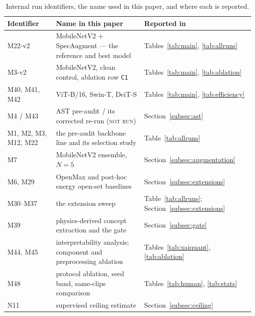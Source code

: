 \documentclass[journal,onecolumn]{IEEEtran}
\newcommand{\notrun}{\textsc{not run}}
\begin{document}
\begin{table}[!htbp]
\centering
\caption{Internal run identifiers, the name used in this paper, and where each is reported.}
\label{tab:runmap}
\footnotesize
\begin{tabular}{lll}
\toprule
Identifier & Name in this paper & Reported in \\
\midrule
M22-v2 & MobileNetV2 + SpecAugment --- the reference and best model & Tables~\ref{tab:main}, \ref{tab:allruns} \\
M3-v2 & MobileNetV2, clean control, ablation row \texttt{C1} & Tables~\ref{tab:main}, \ref{tab:ablation} \\
M40, M41, M42 & ViT-B/16, Swin-T, DeiT-S & Tables~\ref{tab:main}, \ref{tab:efficiency} \\
M4 / M43 & AST pre-audit / its corrected re-run (\notrun) & Section~\ref{subsec:ast} \\
M1, M2, M3, M12, M22 & the pre-audit backbone line and its selection study & Table~\ref{tab:allruns} \\
M7 & MobileNetV2 ensemble, $N = 5$ & Section~\ref{subsec:augmentation} \\
M6, M29 & OpenMax and post-hoc energy open-set baselines & Section~\ref{subsec:extensions} \\
M30--M37 & the extension sweep & Table~\ref{tab:allruns}; Section~\ref{subsec:extensions} \\
M39 & physics-derived concept extraction and the gate & Section~\ref{subsec:gate} \\
M44, M45 & interpretability analysis; component and preprocessing ablation & Tables~\ref{tab:xaiquant}, \ref{tab:ablation} \\
M48 & protocol ablation, seed band, same-clips comparison & Tables~\ref{tab:human}, \ref{tab:stats} \\
N11 & supervised ceiling estimate & Section~\ref{subsec:ceiling} \\
\bottomrule
\end{tabular}
\end{table}



\end{document}
